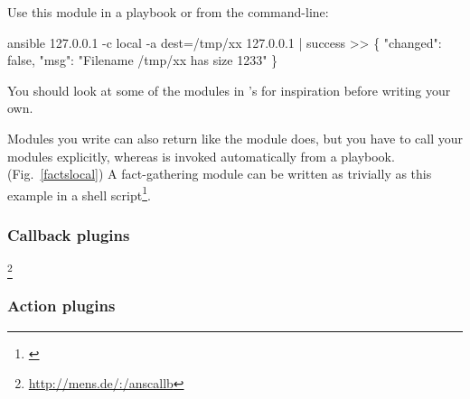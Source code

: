 Use this module in a playbook or from the command-line:

\begin{extymeta}
ansible 127.0.0.1 -c local  -a dest=/tmp/xx
127.0.0.1 | success >> \{
    "changed": false, 
    "msg": "Filename /tmp/xx has size 1233"
\}
\end{extymeta}

You should look at some of the modules in \ansible{}'s  for
inspiration before writing your own.

Modules you write can also return  like the  module does, but
you have to call your modules explicitly, whereas  is invoked
automatically from a playbook. (Fig.~\ref{factslocal}) A fact-gathering module
can be written as trivially as this example in a shell script\footnote{\url{}}.



\subsubsection*{Callback plugins}

	\footnote{\url{http://mens.de/:/anscallb}}

\subsubsection*{Action plugins}
